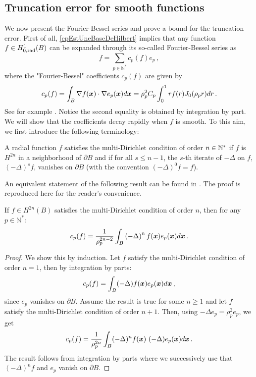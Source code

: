 \documentclass[main]{subfiles}
\begin{document}
\subsection{Truncation error for smooth functions}
\label{FourierBesselTruncError}
We now present the Fourier-Bessel series and prove a bound for the truncation error. First of all, \autoref{epEstUneBaseDeHilbert} implies that any function $f \in H^1_{0,\textup{rad}}(B)$ can be expanded through its so-called Fourier-Bessel series as
\[f = \sum_{p\in \mathbb{N}^*}c_p(f)e_{p}\,,\]
where the "Fourier-Bessel" coefficients $c_p(f)$ are given by
\[c_p(f) = \displaystyle \int_B \nabla f(\boldsymbol{x}) \cdot \nabla e_{p}(\boldsymbol{x}) d\boldsymbol{x} = \rho_p ^2 C_p\int_{0}^1 r f(r) J_0(\rho_p r) dr\,.\]
See for example \cite[Chap. 18, Eq. (2)]{watson1995treatise}. Notice the second equality is obtained by integration by part. We will show that the coefficients decay rapidly when $f$ is smooth. To this aim, we first introduce the following terminology: 
\begin{definition}
	A radial function $f$ satisfies the multi-Dirichlet condition of order $n \in \mathbb{N}^*$ if $f$ is $H^{2n}$ in a neighborhood of $\partial B$ and if for all $s \leq n-1$, the $s$-th iterate of $-\Delta$ on $f$, $(-\Delta)^s f$, vanishes on $\partial B$ (with the convention $(-\Delta)^0 f = f$). 
\end{definition}
An equivalent statement of the following result can be found in \cite[Chap. 8, Sec. 20, Thm. 1]{tolstov2012fourier}. The proof is reproduced here for the reader's convenience. 
\begin{proposition} 
	\label{DecroissanceFourierBessel}
	If $f \in H^{2n}(B)$ satisfies the multi-Dirichlet condition of order $n$, then for any $p \in \mathbb{N}^*$:
	\[ c_p(f) = \dfrac{1}{\rho_{p}^{2n-2}} \int_{B}\left(-\Delta\right)^{n} f(\boldsymbol{x})e_p(\boldsymbol{x}) d\boldsymbol{x}\,.\] 
\end{proposition}
\begin{proof}
	We show this by induction. Let $f$ satisfy the multi-Dirichlet condition of order $n=1$, then by integration by parts:
	\[c_p(f) = \int_{B}(-\Delta)f(\boldsymbol{x}) e_p(\boldsymbol{x})d\boldsymbol{x}\,,\]
	since $e_p$ vanishes on $\partial B$.
	Assume the result is true for some $n \geq 1$ and let $f$ satisfy the multi-Dirichlet condition of order $n+1$. Then, using $-\Delta e_p = \rho_p^2e_p$, we get
	\[c_p(f) = \frac{1}{\rho_p^{2n}}\int_{B}(-\Delta)^{n}f(\boldsymbol{x})~ (-\Delta) e_p(\boldsymbol{x}) d\boldsymbol{x}\,.\]
	The result follows from integration by parts where we successively use that $(-\Delta)^{n}f$ and $e_p$ vanish on $\partial B$.
	
\end{proof}
\end{document}
